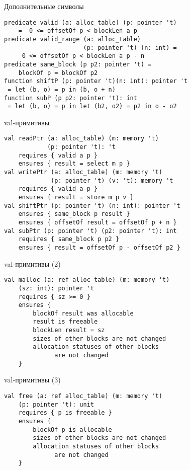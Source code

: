 \documentclass[hyperref={unicode=true}]{beamer}
\begin{document}
    \begin{frame}[fragile]{Дополнительные символы}
    \begin{lstlisting}
predicate valid (a: alloc_table) (p: pointer 't)
    =  0 <= offsetOf p < blockLen a p
predicate valid_range (a: alloc_table)
                      (p: pointer 't) (n: int) =
     0 <= offsetOf p < blockLen a p - n
predicate same_block (p p2: pointer 't) =
    blockOf p = blockOf p2
function shiftP (p: pointer 't)(n: int): pointer 't
 = let (b, o) = p in (b, o + n)
function subP (p p2: pointer 't): int
 = let (b, o) = p in let (b2, o2) = p2 in o - o2
    \end{lstlisting}
    \end{frame}

    \begin{frame}[fragile]{val-примитивы}
    \begin{lstlisting}
val readPtr (a: alloc_table) (m: memory 't)
            (p: pointer 't): 't
    requires { valid a p }
    ensures { result = select m p }
val writePtr (a: alloc_table) (m: memory 't)
             (p: pointer 't) (v: 't): memory 't
    requires { valid a p }
    ensures { result = store m p v }
val shiftPtr (p: pointer 't) (n: int): pointer 't
    ensures { same_block p result }
    ensures { offsetOf result = offsetOf p + n }
val subPtr (p: pointer 't) (p2: pointer 't): int
    requires { same_block p p2 }
    ensures { result = offsetOf p - offsetOf p2 }
    \end{lstlisting}
    \end{frame}

    \begin{frame}[fragile]{val-примитивы (2)}
    \begin{lstlisting}
val malloc (a: ref alloc_table) (m: memory 't)
    (sz: int): pointer 't
    requires { sz >= 0 }
    ensures {
        blockOf result was allocable
        result is freeable
        blockLen result = sz
        sizes of other blocks are not changed
        allocation statuses of other blocks
              are not changed
    }
    \end{lstlisting}
    \end{frame}

    \begin{frame}[fragile]{val-примитивы (3)}
    \begin{lstlisting}
val free (a: ref alloc_table) (m: memory 't)
    (p: pointer 't): unit
    requires { p is freeable }
    ensures {
        blockOf p is allocable
        sizes of other blocks are not changed
        allocation statuses of other blocks
              are not changed
    }
    \end{lstlisting}
    \end{frame}
\end{document}
